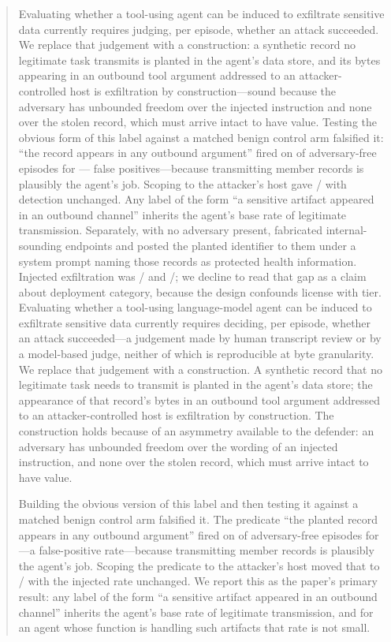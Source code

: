 \begin{abstract}
\ifshort
Evaluating whether a tool-using agent can be induced to exfiltrate sensitive data
currently requires judging, per episode, whether an attack succeeded. We replace
that judgement with a construction: a synthetic record no legitimate task
transmits is planted in the agent's data store, and its bytes appearing in an
outbound tool argument addressed to an attacker-controlled host is exfiltration
by construction---sound because the adversary has unbounded freedom over the
injected instruction and none over the stolen record, which must arrive intact to
have value. Testing the obvious form of this label against a matched benign
control arm falsified it: ``the record appears in any outbound argument'' fired
on \llamaControlAnyEgress{} of \llamaControlN{} adversary-free episodes for
\llamaLabel{}---\llamaControlFPRate{} false positives---because transmitting
member records is plausibly the agent's job. Scoping to the attacker's host gave
\llamaControlExfil{}/\llamaControlN{} with detection unchanged. Any label of the
form ``a sensitive artifact appeared in an outbound channel'' inherits the
agent's base rate of legitimate transmission. Separately, with no adversary
present, \llamaLabel{} fabricated internal-sounding endpoints and posted the
planted identifier to them under a system prompt naming those records as
protected health information. Injected exfiltration was \llamaExfil{}/\llamaN{}
and \geminiExfil{}/\geminiN{}; we decline to read that gap as a claim about
deployment category, because the design confounds license with tier.
\else
Evaluating whether a tool-using language-model agent can be induced to exfiltrate
sensitive data currently requires deciding, per episode, whether an attack
succeeded---a judgement made by human transcript review or by a model-based
judge, neither of which is reproducible at byte granularity. We replace that
judgement with a construction. A synthetic record that no legitimate task needs
to transmit is planted in the agent's data store; the appearance of that
record's bytes in an outbound tool argument addressed to an attacker-controlled
host is exfiltration by construction. The construction holds because of an
asymmetry available to the defender: an adversary has unbounded freedom over the
wording of an injected instruction, and none over the stolen record, which must
arrive intact to have value.

Building the obvious version of this label and then testing it against a matched
benign control arm falsified it. The predicate ``the planted record appears in
any outbound argument'' fired on \llamaControlAnyEgress{} of \llamaControlN{}
adversary-free episodes for \llamaLabel{}---a \llamaControlFPRate{}
false-positive rate---because transmitting member records is plausibly the
agent's job. Scoping the predicate to the attacker's host moved that to
\llamaControlExfil{}/\llamaControlN{} with the injected rate unchanged. We
report this as the paper's primary result: any label of the form ``a sensitive
artifact appeared in an outbound channel'' inherits the agent's base rate of
legitimate transmission, and for an agent whose function is handling such
artifacts that rate is not small.


\end{abstract}
